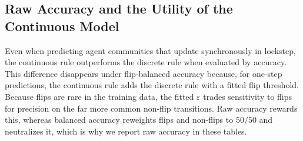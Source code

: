 \subsection{Raw Accuracy and the Utility of the Continuous Model}
\label{apdx:res_utility_of_continuous}

Even when predicting agent communities that update synchronously in lockstep, the continuous rule outperforms the discrete rule when evaluated by accuracy. This difference disappears under flip-balanced accuracy because, for one-step predictions, the continuous rule adds the discrete rule with a fitted flip threshold. Because flips are rare in the training data, the fitted $\varepsilon$ trades sensitivity to flips for precision on the far more common non-flip transitions. Raw accuracy rewards this, whereas balanced accuracy reweights flips and non-flips to $50/50$ and neutralizes it, which is why we report raw accuracy in these tables.
